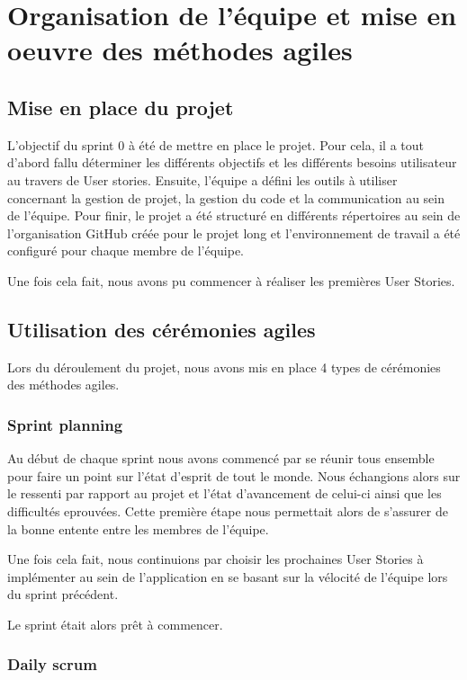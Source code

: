 \documentclass[11pt]{report}
\begin{document}
\chapter{Organisation de l'équipe et mise en oeuvre des méthodes agiles}

\section{Mise en place du projet}
L'objectif du sprint 0 à été de mettre en place le projet. Pour cela, il a tout d'abord fallu
déterminer les différents objectifs et les différents besoins utilisateur au travers de User stories. Ensuite, l'équipe a défini
les outils à utiliser concernant la gestion de projet, la gestion du code et la communication au sein de l'équipe.
Pour finir, le projet a été structuré en différents répertoires au sein de l'organisation GitHub créée pour le projet long
et l'environnement de travail a été configuré pour chaque membre de l'équipe.\newline

Une fois cela fait, nous avons pu commencer à réaliser les premières User Stories.

\section{Utilisation des cérémonies agiles}

Lors du déroulement du projet, nous avons mis en place 4 types de cérémonies des méthodes agiles.

\subsection{Sprint planning}

Au début de chaque sprint nous avons commencé par se réunir tous ensemble pour faire un point sur l'état d'esprit de tout le monde.
Nous échangions alors sur le ressenti par rapport au projet et l'état d'avancement de celui-ci ainsi que les difficultés eprouvées. Cette première étape
nous permettait alors de s'assurer de la bonne entente entre les membres de l'équipe.

Une fois cela fait, nous continuions par choisir les prochaines User Stories à implémenter au sein de l'application en se basant sur la vélocité
de l'équipe lors du sprint précédent.\newline

Le sprint était alors prêt à commencer.

\subsection{Daily scrum}
\end{document}
